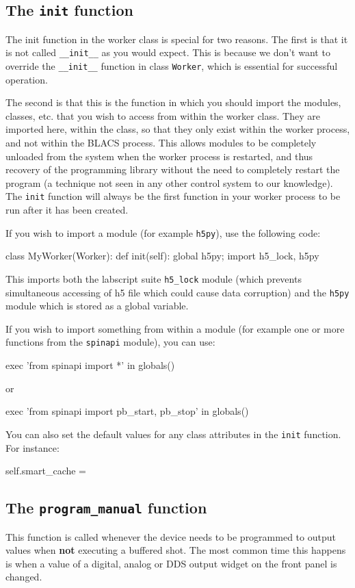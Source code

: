 \documentclass[12pt]{article}
\begin{document}
\subsection{The \texttt{init} function}
The init function in the worker class is special for two reasons. 
The first is that it is not called \texttt{\_\_init\_\_} as you would expect. 
This is because we don't want to override the \texttt{\_\_init\_\_} function in class \texttt{Worker},  which is essential for successful operation.

The second is that this is the function in which you should import the modules, classes, etc. that you wish to access from within the worker class. 
They are imported here, within the class, so that they only exist within the worker process, and not within the BLACS process. 
This allows modules to be completely unloaded from the system when the worker process is restarted, and thus recovery of the programming library without the need to completely restart the program (a technique not seen in any other control system to our knowledge).
The \texttt{{init}} function will always be the first function in your worker process to be run after it has been created.

If you wish to import a module (for example \texttt{h5py}), use the following code:
\begin{python}
class MyWorker(Worker):
    def init(self):
        global h5py; import h5_lock, h5py
\end{python}
This imports both the labscript suite \texttt{h5\_lock} module (which prevents simultaneous accessing of h5 file which could cause data corruption) and the \texttt{h5py} module which is stored as a global variable.

If you wish to import something from within a module (for example one or more functions from the \texttt{spinapi} module), you can use:
\begin{python}
        exec 'from spinapi import *' in globals()
\end{python}
or
\begin{python}
        exec 'from spinapi import pb_start, pb_stop' in globals()
\end{python}

You can also set the default values for any class attributes in the \texttt{init} function. For instance:
\begin{python}
        self.smart_cache = {}
\end{python}


\subsection{The \texttt{program\_manual} function}
This function is called whenever the device needs to be programmed to output values when \textbf{not} executing a buffered shot.
The most common time this happens is when a value of a digital, analog or DDS output widget on the front panel is changed.
\end{document}
